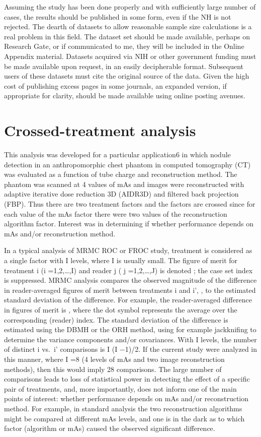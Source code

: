 \documentclass[
]{book}
\begin{document}
Assuming the study has been done properly and with sufficiently large number of cases, the results should be published in some form, even if the NH is not rejected. The dearth of datasets to allow reasonable sample size calculations is a real problem in this field. The dataset set should be made available, perhaps on Research Gate, or if communicated to me, they will be included in the Online Appendix material. Datasets acquired via NIH or other government funding must be made available upon request, in an easily decipherable format. Subsequent users of these datasets must cite the original source of the data. Given the high cost of publishing excess pages in some journals, an expanded version, if appropriate for clarity, should be made available using online posting avenues.

\hypertarget{crossed-treatment-analysis}{%
\section{Crossed-treatment analysis}\label{crossed-treatment-analysis}}

This analysis was developed for a particular application6 in which nodule detection in an anthropomorphic chest phantom in computed tomography (CT) was evaluated as a function of tube charge and reconstruction method. The phantom was scanned at 4 values of mAs and images were reconstructed with adaptive iterative dose reduction 3D (AIDR3D) and filtered back projection (FBP). Thus there are two treatment factors and the factors are crossed since for each value of the mAs factor there were two values of the reconstruction algorithm factor. Interest was in determining if whether performance depends on mAs and/or reconstruction method.

In a typical analysis of MRMC ROC or FROC study, treatment is considered as a single factor with I levels, where I is usually small. The figure of merit for treatment i (i =1,2,\ldots,I) and reader j ( j =1,2,\ldots,J) is denoted ; the case set index is suppressed. MRMC analysis compares the observed magnitude of the difference in reader-averaged figures of merit between treatments i and i', , to the estimated standard deviation of the difference. For example, the reader-averaged difference in figures of merit is , where the dot symbol represents the average over the corresponding (reader) index. The standard deviation of the difference is estimated using the DBMH or the ORH method, using for example jackknifing to determine the variance components and/or covariances. With I levels, the number of distinct i vs.~i' comparisons is I (I −1)/2. If the current study were analyzed in this manner, where I =8 (4 levels of mAs and two image reconstruction methods), then this would imply 28 comparisons. The large number of comparisons leads to loss of statistical power in detecting the effect of a specific pair of treatments, and, more importantly, does not inform one of the main points of interest: whether performance depends on mAs and/or reconstruction method. For example, in standard analysis the two reconstruction algorithms might be compared at different mAs levels, and one is in the dark as to which factor (algorithm or mAs) caused the observed significant difference.
\end{document}
